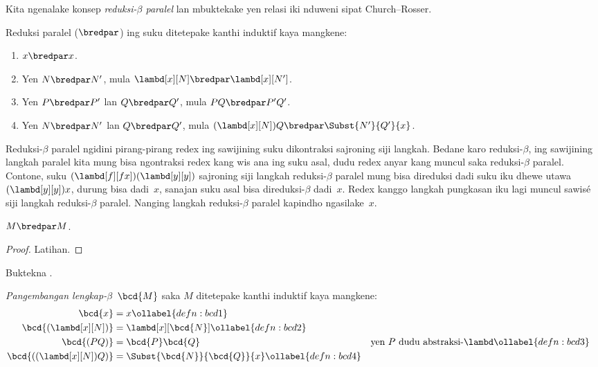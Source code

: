 \documentclass[../../../include/open-logic-section]{subfiles}
\begin{document}


Kita ngenalake konsep
\emph{reduksi-$\beta$ paralel}
lan mbuktekake yen relasi iki
nduweni sipat Church--Rosser.

\begin{defn} 
  Reduksi paralel ($\bredpar$)
  ing suku ditetepake kanthi
  induktif kaya mangkene:
  \begin{enumerate}
    \item {} $x \bredpar x$.
    \item {} Yen $N \bredpar N'$, mula $\lambd[x][N] \bredpar
      \lambd[x][N']$.
    \item {} Yen $P \bredpar P'$ lan $Q \bredpar Q'$, mula $PQ \bredpar
      P'Q'$.
    \item {} Yen $N \bredpar N'$ lan $Q \bredpar Q'$, mula
      $(\lambd[x][N])Q \bredpar \Subst{N'}{Q'}{x}$.
  \end{enumerate}
\end{defn}

Reduksi-$\beta$ paralel ngidini
pirang-pirang redex ing sawijining
suku dikontraksi sajroning siji
langkah. Bedane karo
reduksi-$\beta$, ing sawijining
langkah paralel kita mung bisa
ngontraksi redex kang wis ana
ing suku asal, dudu redex anyar
kang muncul saka reduksi-$\beta$
paralel.
Contone, suku
$(\lambd[f][fx])(\lambd[y][y])$
sajroning siji langkah reduksi-$\beta$
paralel
mung bisa direduksi dadi suku
iku dhewe utawa
$(\lambd[y][y])x$, durung
bisa dadi~$x$, sanajan suku
asal bisa direduksi-$\beta$
dadi~$x$. Redex kanggo langkah
pungkasan iku lagi muncul
sawisé siji langkah reduksi-$\beta$
paralel. Nanging langkah reduksi-$\beta$
paralel
kapindho ngasilake~$x$.

\begin{thm}
  $M \bredpar M$.
\end{thm}

\begin{proof}
  Latihan.
\end{proof}

\begin{prob}
  Buktekna .
\end{prob}

\begin{defn}
  \emph{Pangembangan lengkap-$\beta$}~$\bcd{M}$
  saka $M$ ditetepake kanthi
  induktif kaya mangkene:
  \begin{align}
    \bcd{x} &= x \ollabel{defn:bcd1} \\
    \bcd{(\lambd[x][N])} &= \lambd[x][\bcd{N}] \ollabel{defn:bcd2}\\
    \bcd{(PQ)} &= \bcd{P}\bcd{Q} && \text{yen $P$ dudu abstraksi-$\lambd$}
    \ollabel{defn:bcd3} \\
    \bcd{((\lambd[x][N])Q)} &= \Subst{\bcd{N}}{\bcd{Q}}{x} \ollabel{defn:bcd4}
  \end{align}
\end{defn}
\end{document}
